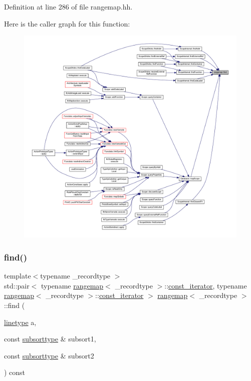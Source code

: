 Definition at line 286 of file rangemap.\+hh.

Here is the caller graph for this function\+:
\nopagebreak
\begin{figure}[H]
\begin{center}
\leavevmode
\includegraphics[width=350pt]{classrangemap_a1a9e4bf2a0972dd23183e55bd3f40f49_icgraph}
\end{center}
\end{figure}
\mbox{\label{classrangemap_abb505277cefe8819c7100b5fb5a4deb5}} 
\subsubsection{\texorpdfstring{find()}{find()}\hspace{0.1cm}{\footnotesize\ttfamily [2/2]}}
{\footnotesize\ttfamily template$<$typename \+\_\+recordtype $>$ \\
std\+::pair$<$ typename \mbox{\hyperlink{classrangemap}{rangemap}}$<$ \+\_\+recordtype $>$\+::\mbox{\hyperlink{classrangemap_affa7462e68d053d3a066fe0b8d46a99d}{const\+\_\+iterator}}, typename \mbox{\hyperlink{classrangemap}{rangemap}}$<$ \+\_\+recordtype $>$\+::\mbox{\hyperlink{classrangemap_affa7462e68d053d3a066fe0b8d46a99d}{const\+\_\+iterator}} $>$ \mbox{\hyperlink{classrangemap}{rangemap}}$<$ \+\_\+recordtype $>$\+::find (\begin{DoxyParamCaption}\item[{\mbox{\hyperlink{classrangemap_a54c8f7622f9af4c4232d764cf9ed11fa}{linetype}}}]{a,  }\item[{const \mbox{\hyperlink{classrangemap_aeef55d9063b5d89e075229fad91ea631}{subsorttype}} \&}]{subsort1,  }\item[{const \mbox{\hyperlink{classrangemap_aeef55d9063b5d89e075229fad91ea631}{subsorttype}} \&}]{subsort2 }\end{DoxyParamCaption}) const}



